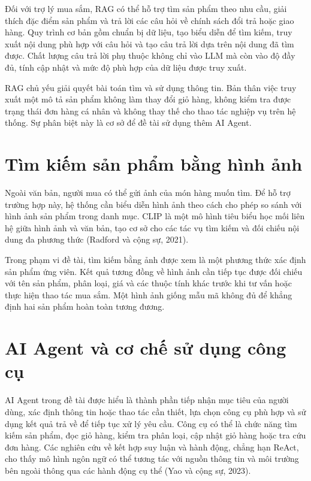 \documentclass[12pt,a4paper,oneside]{report}
\begin{document}
Đối với trợ lý mua sắm, RAG có thể hỗ trợ tìm sản phẩm theo nhu cầu, giải thích đặc điểm sản phẩm và trả lời các câu hỏi về chính sách đổi trả hoặc giao hàng. Quy trình cơ bản gồm chuẩn bị dữ liệu, tạo biểu diễn để tìm kiếm, truy xuất nội dung phù hợp với câu hỏi và tạo câu trả lời dựa trên nội dung đã tìm được. Chất lượng câu trả lời phụ thuộc không chỉ vào LLM mà còn vào độ đầy đủ, tính cập nhật và mức độ phù hợp của dữ liệu được truy xuất.

RAG chủ yếu giải quyết bài toán tìm và sử dụng thông tin. Bản thân việc truy xuất một mô tả sản phẩm không làm thay đổi giỏ hàng, không kiểm tra được trạng thái đơn hàng cá nhân và không thay thế cho thao tác nghiệp vụ trên hệ thống. Sự phân biệt này là cơ sở để đề tài sử dụng thêm AI Agent.

\section{Tìm kiếm sản phẩm bằng hình ảnh}
Ngoài văn bản, người mua có thể gửi ảnh của món hàng muốn tìm. Để hỗ trợ trường hợp này, hệ thống cần biểu diễn hình ảnh theo cách cho phép so sánh với hình ảnh sản phẩm trong danh mục. CLIP là một mô hình tiêu biểu học mối liên hệ giữa hình ảnh và văn bản, tạo cơ sở cho các tác vụ tìm kiếm và đối chiếu nội dung đa phương thức (Radford và cộng sự, 2021). \cite{radford2021}

Trong phạm vi đề tài, tìm kiếm bằng ảnh được xem là một phương thức xác định sản phẩm ứng viên. Kết quả tương đồng về hình ảnh cần tiếp tục được đối chiếu với tên sản phẩm, phân loại, giá và các thuộc tính khác trước khi tư vấn hoặc thực hiện thao tác mua sắm. Một hình ảnh giống mẫu mã không đủ để khẳng định hai sản phẩm hoàn toàn tương đương.

\section{AI Agent và cơ chế sử dụng công cụ}
AI Agent trong đề tài được hiểu là thành phần tiếp nhận mục tiêu của người dùng, xác định thông tin hoặc thao tác cần thiết, lựa chọn công cụ phù hợp và sử dụng kết quả trả về để tiếp tục xử lý yêu cầu. Công cụ có thể là chức năng tìm kiếm sản phẩm, đọc giỏ hàng, kiểm tra phân loại, cập nhật giỏ hàng hoặc tra cứu đơn hàng. Các nghiên cứu về kết hợp suy luận và hành động, chẳng hạn ReAct, cho thấy mô hình ngôn ngữ có thể tương tác với nguồn thông tin và môi trường bên ngoài thông qua các hành động cụ thể (Yao và cộng sự, 2023). \cite{yao2023}
\end{document}
